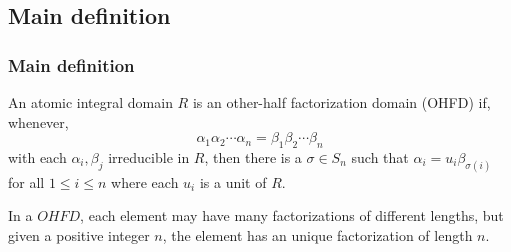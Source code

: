 \subsection{Main definition}

\begin{frame}
  \frametitle{Main definition}
  \begin{definition}
    An atomic integral domain $R$ is an \alert{other-half factorization domain (OHFD)} if, whenever,
    $$ \alpha_1 \alpha_2 \cdots \alpha_n = \beta_1 \beta_2 \cdots \beta_n $$
    with each $\alpha_i, \beta_j$ irreducible in $R$, then there is a $\sigma \in S_n$ such that $\alpha_i = u_i \beta_{\sigma(i)}$ for all $1 \leq i \leq n$ where each $u_i$ is a unit of $R$.
  \end{definition}
  \pause
  \begin{fact}
    In a $OHFD$, each element may have many factorizations of different lengths, but given a positive integer $n$, the element has an unique factorization of length $n$.
  \end{fact}
\end{frame}

